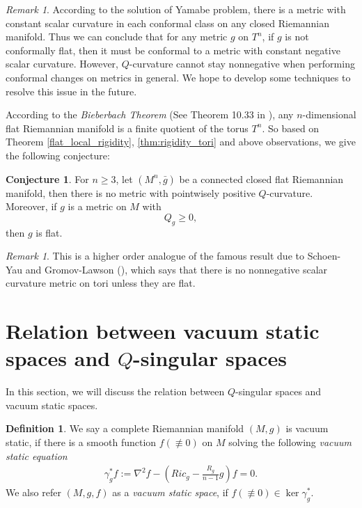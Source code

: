 \documentclass[12pt]{amsart}
\theoremstyle{definition}
\newtheorem{definition}[theorem]{Definition}
\newtheorem{conjecture}[theorem]{Conjecture}
\theoremstyle{remark}
\newtheorem{remark}[theorem]{Remark}
\numberwithin{equation}{section}
\begin{document}
\begin{remark}
According to the solution of Yamabe problem, there is a metric with constant scalar curvature in each conformal class on any closed Riemannian manifold. Thus we can conclude that for any metric $g$ on $T^n$, if $g$ is not conformally flat, then it must be conformal to a metric with constant negative scalar curvature. However, $Q$-curvature cannot stay nonnegative when performing conformal changes on metrics in general. We hope to develop some techniques to resolve this issue in the future.
\end{remark}

According to the \emph{Bieberbach Theorem} (See Theorem 10.33 in \cite{C-L-N}), any $n$-dimensional flat Riemannian manifold is a finite quotient of the torus $T^n$. So based on Theorem \ref{flat_local_rigidity}, \ref{thm:rigidity_tori} and above observations, we give the following conjecture:

\begin{conjecture}\label{Positive_Q_on_torus}
For $n \geq 3$, let $(M^n,\bar{g})$ be a connected closed flat Riemannian manifold, then there is no metric with pointwisely positive $Q$-curvature. Moreover, if $g$ is a metric on $M$ with $$Q_g\geq 0,$$ then $g$ is flat.
\end{conjecture}

\begin{remark}
This is a higher order analogue of the famous result due to Schoen-Yau and Gromov-Lawson (\cite{S-Y_1, S-Y_2, G-L_1, G-L_2}), which says that there is no nonnegative scalar curvature metric on tori unless they are flat. \end{remark}

\section{Relation between vacuum static spaces and $Q$-singular spaces}

In this section, we will discuss the relation between $Q$-singular spaces and vacuum static spaces.

\begin{definition}
We say a complete Riemannian manifold $(M,g)$ is vacuum static, if there is a smooth function $f (\not\equiv 0)$ on $M$ solving the following \emph{vacuum static equation} 
\begin{align}
\gamma_g^* f := \nabla^2 f - \left(Ric_g - \frac{R_g}{n-1} g \right) f = 0.
\end{align}
We also refer $(M,g,f)$ as a \emph{vacuum static space}, if $f (\not\equiv 0) \in \ker \gamma_g^*$.
\end{definition}
\end{document}
